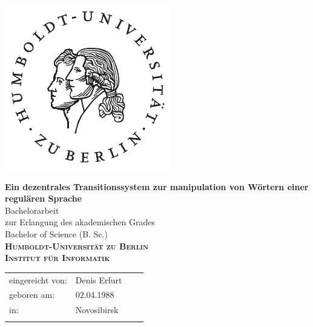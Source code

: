 \begin{titlepage}
\hspace{0cm}
\vspace{-2cm}
 
\begin{flushright}
\includegraphics[width=3.2 cm]{bilder/husiegel.pdf}
\end{flushright}
 
 
\begin{center}
  \vspace{0.5 cm}
  \LARGE{\bf Ein dezentrales Transitionssystem zur manipulation von Wörtern einer regulären Sprache} \\ %
  \vspace{1 cm}
  \LARGE  Bachelorarbeit \\ %
  \vspace{1cm}
  \Large zur Erlangung des akademischen Grades \\
  Bachelor of Science (B. Sc.) \\ %
  \vspace{1.0cm}
  {\large
    \bf{
      \scshape
      Humboldt-Universit\"at zu Berlin \\
      Institut f\"ur Informatik\\
    }
  } 
\end{center}
\vspace{1.0 cm}
{\large
  \begin{tabular}{llll}
    eingereicht von:    & Denis Erfurt && \\ %
    geboren am:         & 02.04.1988 && \\
    in:                 & Novosibirsk && \\
    &&&\\

\end{tabular}}
\end{titlepage}
